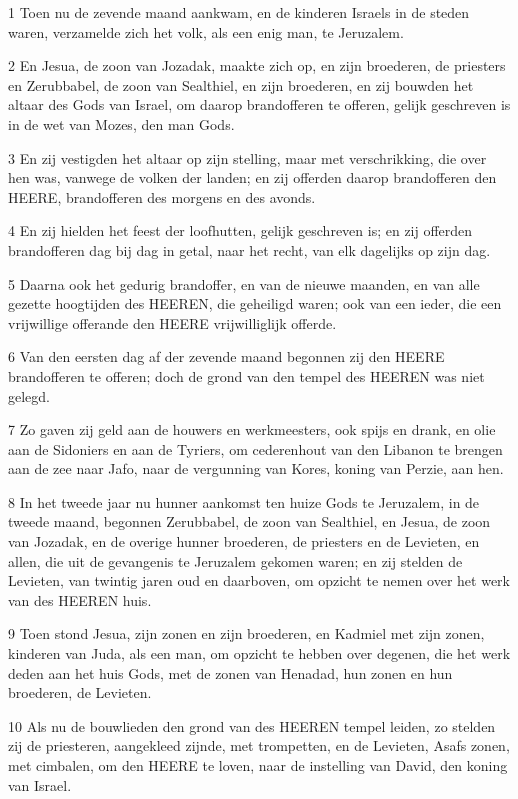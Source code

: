 \par 1 Toen nu de zevende maand aankwam, en de kinderen Israels in de steden waren, verzamelde zich het volk, als een enig man, te Jeruzalem.
\par 2 En Jesua, de zoon van Jozadak, maakte zich op, en zijn broederen, de priesters en Zerubbabel, de zoon van Sealthiel, en zijn broederen, en zij bouwden het altaar des Gods van Israel, om daarop brandofferen te offeren, gelijk geschreven is in de wet van Mozes, den man Gods.
\par 3 En zij vestigden het altaar op zijn stelling, maar met verschrikking, die over hen was, vanwege de volken der landen; en zij offerden daarop brandofferen den HEERE, brandofferen des morgens en des avonds.
\par 4 En zij hielden het feest der loofhutten, gelijk geschreven is; en zij offerden brandofferen dag bij dag in getal, naar het recht, van elk dagelijks op zijn dag.
\par 5 Daarna ook het gedurig brandoffer, en van de nieuwe maanden, en van alle gezette hoogtijden des HEEREN, die geheiligd waren; ook van een ieder, die een vrijwillige offerande den HEERE vrijwilliglijk offerde.
\par 6 Van den eersten dag af der zevende maand begonnen zij den HEERE brandofferen te offeren; doch de grond van den tempel des HEEREN was niet gelegd.
\par 7 Zo gaven zij geld aan de houwers en werkmeesters, ook spijs en drank, en olie aan de Sidoniers en aan de Tyriers, om cederenhout van den Libanon te brengen aan de zee naar Jafo, naar de vergunning van Kores, koning van Perzie, aan hen.
\par 8 In het tweede jaar nu hunner aankomst ten huize Gods te Jeruzalem, in de tweede maand, begonnen Zerubbabel, de zoon van Sealthiel, en Jesua, de zoon van Jozadak, en de overige hunner broederen, de priesters en de Levieten, en allen, die uit de gevangenis te Jeruzalem gekomen waren; en zij stelden de Levieten, van twintig jaren oud en daarboven, om opzicht te nemen over het werk van des HEEREN huis.
\par 9 Toen stond Jesua, zijn zonen en zijn broederen, en Kadmiel met zijn zonen, kinderen van Juda, als een man, om opzicht te hebben over degenen, die het werk deden aan het huis Gods, met de zonen van Henadad, hun zonen en hun broederen, de Levieten.
\par 10 Als nu de bouwlieden den grond van des HEEREN tempel leiden, zo stelden zij de priesteren, aangekleed zijnde, met trompetten, en de Levieten, Asafs zonen, met cimbalen, om den HEERE te loven, naar de instelling van David, den koning van Israel.
